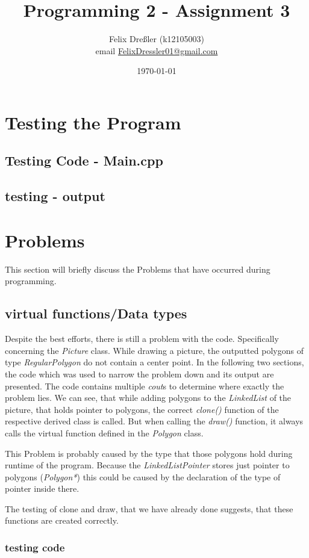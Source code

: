 \documentclass[11pt,titlepage]{article}
\title{Programming 2 - Assignment 3}
\author{Felix Dreßler (k12105003)\\ email \href{mailto:FelixDressler01@gmail.com}{FelixDressler01@gmail.com}}
\date{\today} %
\begin{document}
\maketitle
	\section{Testing the Program}
		\subsection{Testing Code - Main.cpp}
		
		\subsection{testing - output}


	\section{Problems}
	This section will briefly discuss the Problems that have occurred during programming.
		\subsection{virtual functions/Data types}
			Despite the best efforts, there is still a problem with the code. Specifically concerning the \emph{Picture} class. While drawing a picture, the outputted polygons of type \emph{RegularPolygon} do not contain a center point. In the following two sections, the code which was used to narrow the problem down and its output are presented.
			The code contains multiple \emph{cout}s to determine where exactly the problem lies.
			We can see, that while adding polygons to the \emph{LinkedList} of the picture, that holds pointer to polygons, the correct \emph{clone()} function of the respective derived class is called. But when calling the \emph{draw()} function, it always calls the virtual function defined in the \emph{Polygon} class.
			
			This Problem is probably caused by the type that those polygons hold during runtime of the program. Because the \emph{LinkedListPointer} stores just pointer to polygons (\emph{Polygon*}) this could be caused by the declaration of the type of pointer inside there.
			
			The testing of clone and draw, that we have already done suggests, that these functions are created correctly.
			\subsubsection{testing code}	
		
\end{document}
